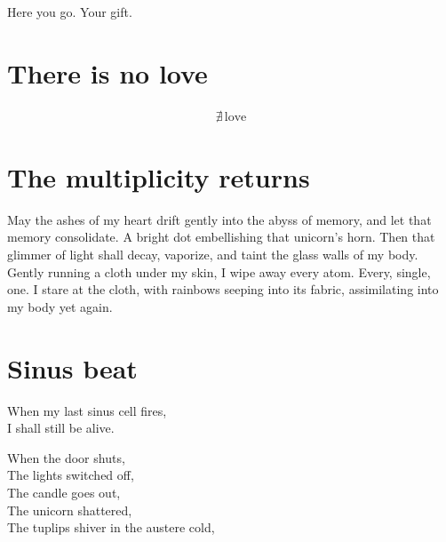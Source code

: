 \documentclass[parskip=half-,12pt,oneside,openany,a5paper,numbers=endperiod]{scrbook}
\begin{document}
Here you go. Your gift.

\chapter{There is no love}

\begingroup
\fontsize{50}{60}\selectfont
\begin{align*}
	\nexists\,\text{love}
\end{align*}
\endgroup




\chapter{The multiplicity returns}

May the ashes of my heart drift gently into the abyss of memory,
and let that memory consolidate.
A bright dot embellishing that unicorn's horn.
Then that glimmer of light shall decay, vaporize, and taint the glass walls of my body.
Gently running a cloth under my skin,
I wipe away every atom.
Every, single, one.
I stare at the cloth,
with rainbows seeping into its fabric,
assimilating into my body yet again.

\chapter{Sinus beat}

When my last sinus cell fires,\\
I shall still be alive.

When the door shuts,\\
The lights switched off,\\
The candle goes out,\\
The unicorn shattered,\\
The tuplips shiver in the austere cold,
\end{document}
